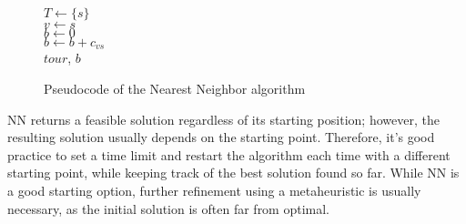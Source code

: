 \begin{figure}[htbp]
    \begin{algorithm}[H]
        \BlankLine
        $T \gets \{s\}$\\
        $v \gets s$\\
        $b \gets 0$\\
        $b \gets b + c_{vs}$\\
        \Return $tour$, $b$\\
    \end{algorithm}
    \caption{Pseudocode of the Nearest Neighbor algorithm}
\end{figure}
NN returns a feasible solution regardless of its starting position; however, the resulting solution usually depends on the starting point.
Therefore, it's good practice to set a time limit and restart the algorithm each time with a different starting point, while keeping track of the best solution found so far.
While NN is a good starting option, further refinement using a metaheuristic is usually necessary, as the initial solution is often far from optimal.


